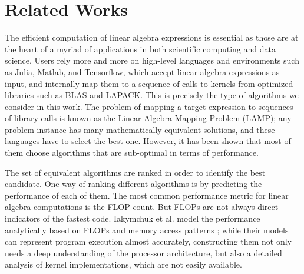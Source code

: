 \documentclass[conference]{IEEEtran}
\newcommand{\p}[1]{{\color{blue} Pdj: #1}}
\begin{document}
\section{Related Works}
\label{sec:rel}

The efficient computation of linear algebra expressions is essential as those are at the heart of a myriad of
applications in both scientific computing and data science. Users rely more and more on high-level languages and
environments such as Julia\cite{julia}, Matlab\cite{MatlabOTB}, and Tensorflow\cite{tensorflow}, which accept linear
algebra expressions as input, and internally map them to a sequence of calls to kernels from optimized libraries such as
BLAS and LAPACK. This is precisely the type of algorithms we consider in this work. The problem of mapping a target
expression to sequences of library calls is known as the Linear Algebra Mapping Problem (LAMP)\cite{psarras2019linear};
any problem instance has many mathematically equivalent solutions, and these languages have to select the best
one. However, it has been shown that most of them choose algorithms that are sub-optimal in terms of performance\cite{psarras2019linear}.



The set of equivalent algorithms are ranked in order to identify the best candidate. One way of ranking different algorithms is by predicting the performance of each of them. The most common performance metric for linear algebra computations is the FLOP count. But FLOPs are not always direct indicators of the fastest code\cite{barthels2019linnea}. Iakymchuk et al. model the performance analytically based on FLOPs and memory access patterns\cite{iakymchuk2012modeling} \cite{iakymchuk2011execution}; while their models can represent program execution almost accurately, constructing them not only needs a deep understanding of the processor architecture, but also a detailed analysis of kernel implementations, which are not easily available.
\end{document}
